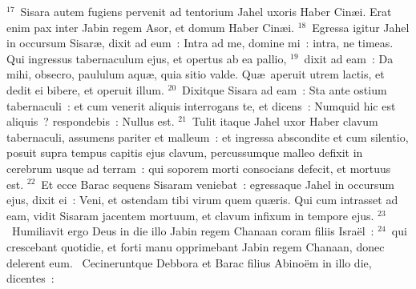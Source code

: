 ${}^{17}$~Sisara autem fugiens pervenit ad tentorium Jahel uxoris Haber Cin\ae i. Erat enim pax inter Jabin regem Asor, et domum Haber Cin\ae i.
${}^{18}$~Egressa igitur Jahel in occursum Sisar\ae , dixit ad eum~: Intra ad me, domine mi~: intra, ne timeas. Qui ingressus tabernaculum ejus, et opertus ab ea pallio,
${}^{19}$~dixit ad eam~: Da mihi, obsecro, paululum aqu\ae , quia sitio valde. Qu\ae\ aperuit utrem lactis, et dedit ei bibere, et operuit illum.
${}^{20}$~Dixitque Sisara ad eam~: Sta ante ostium tabernaculi~: et cum venerit aliquis interrogans te, et dicens~: Numquid hic est aliquis~? respondebis~: Nullus est.
${}^{21}$~Tulit itaque Jahel uxor Haber clavum tabernaculi, assumens pariter et malleum~: et ingressa abscondite et cum silentio, posuit supra tempus capitis ejus clavum, percussumque malleo defixit in cerebrum usque ad terram~: qui soporem morti consocians defecit, et mortuus est.
${}^{22}$~Et ecce Barac sequens Sisaram veniebat~: egressaque Jahel in occursum ejus, dixit ei~: Veni, et ostendam tibi virum quem qu\ae ris. Qui cum intrasset ad eam, vidit Sisaram jacentem mortuum, et clavum infixum in tempore ejus.
${}^{23}$~Humiliavit ergo Deus in die illo Jabin regem Chanaan coram filiis Isra\"el~:
${}^{24}$~qui crescebant quotidie, et forti manu opprimebant Jabin regem Chanaan, donec delerent eum.
~Cecineruntque Debbora et Barac filius Abino\"em in illo die, dicentes~:
